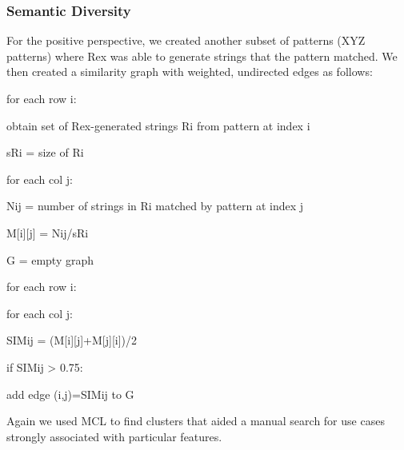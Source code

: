 \subsubsection{Semantic Diversity}
For the positive perspective, we created another subset of patterns (XYZ patterns) where Rex was able to generate strings that the pattern matched.  We then created a similarity graph with weighted, undirected edges as follows:
\begin{description}
\setlength{\parskip}{0pt} %
\setlength{\itemindent}{0in}
\item for each row i:
\setlength{\itemindent}{0.2in}
\item obtain set of Rex-generated strings Ri from pattern at index i
\item sRi = size of Ri
\item for each col j:
\setlength{\itemindent}{0.4in}
\item Nij = number of strings in Ri matched by pattern at index j
\item M[i][j] = Nij/sRi
\setlength{\itemindent}{0in}
\item G = empty graph
\item for each row i:
\setlength{\itemindent}{0.2in}
\item for each col j:
\setlength{\itemindent}{0.4in}
\item SIMij = (M[i][j]+M[j][i])/2
\item if SIMij > 0.75:
\setlength{\itemindent}{0.6in}
\item add edge (i,j)=SIMij to G
\setlength{\itemindent}{0in}
\setlength{\parskip}{10pt} %
\end{description}

Again we used MCL to find clusters that aided a manual search for use cases strongly associated with particular features.



%

%









